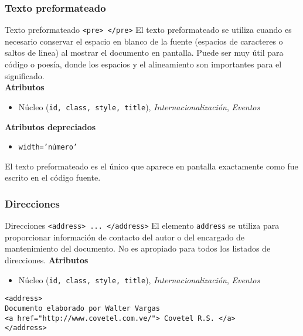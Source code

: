 \subsubsection{Texto preformateado}

\begin{frame}{Texto preformateado \texttt{<pre> </pre>}} %
    El texto preformateado se utiliza cuando es necesario conservar el espacio
    en blanco de la fuente (espacios de caracteres o saltos de linea) al
    mostrar el documento en pantalla. Puede ser muy útil para código o poesía,
    donde los espacios y el alineamiento son importantes para el
    significado.\\[0.5cm]

    \textbf{Atributos}
    \begin{itemize}
        \item Núcleo (\texttt{id, class, style, title}),
        \textit{Internacionalización},  \textit{Eventos}
    \end{itemize}
    \textbf{Atributos depreciados} 
        \begin{itemize}
            \item \texttt{width='número'}
        \end{itemize}

     El texto preformateado es el único que aparece en pantalla exactamente
     como fue escrito en el código fuente. 
\end{frame}


\subsubsection{Direcciones}

\begin{frame}[fragile]{Direcciones \texttt{<address> ... </address>}} %
    El elemento \texttt{address} se utiliza para proporcionar información de
    contacto del autor o del encargado de mantenimiento del documento. No es
    apropiado para todos los listados de direcciones. 
    \textbf{Atributos}
    \begin{itemize}
        \item Núcleo (\texttt{id, class, style, title}),
        \textit{Internacionalización},  \textit{Eventos}
    \end{itemize}
    
    \begin{lstlisting}
<address>
Documento elaborado por Walter Vargas 
<a href="http://www.covetel.com.ve/"> Covetel R.S. </a> 
</address>
    \end{lstlisting}
\end{frame}


